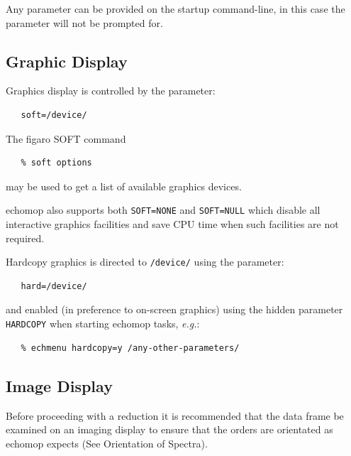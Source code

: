 \documentclass[11pt,twoside]{article}
\newcommand{\htmlref}[2]{#1}
\newcommand{\xref}[3]{#1}
\newcommand{\xlabel}[1]{}
\newcommand{\mlabel}[1]{\xlabel{#1}\label{#1}}
\newcommand{\sunspec}[2]{#1}
\renewcommand{\sunspec}[2]{#2}
\newcommand{\myindex}[1]{\index{#1}}
\renewcommand{\myindex}[1]{}
\begin{document}
Any parameter can be provided on the startup command-line, in
this case the parameter will not be prompted for.


\subsection{\mlabel{graphic_display}Graphic Display}
\myindex{Graphics!setting device}

Graphics display is controlled by the parameter:

\begin{verbatim}
   soft=/device/
\end{verbatim}

The \xref{{\sc figaro}}{sun86}{} \xref{SOFT}{sun86}{SOFT} command

\myindex{FIGARO!SOFT}
\begin{verbatim}
   % soft options
\end{verbatim}

may be used to get a list of available graphics devices.

\myindex{Graphics!null device}
{\sc echomop} also supports both \texttt{SOFT=NONE} and \texttt{SOFT=NULL}
which disable all interactive graphics facilities and save CPU time when
such facilities are not required.

\myindex{Graphics!hardcopy}
Hardcopy graphics is directed to {\tt /device/} using the parameter:

\begin{verbatim}
   hard=/device/
\end{verbatim}

and enabled (in preference to on-screen graphics) using the hidden
parameter \texttt{HARDCOPY} when starting {\sc echomop} tasks, {\it{e.g.}}:

\begin{verbatim}
   % echmenu hardcopy=y /any-other-parameters/
\end{verbatim}


\subsection{\mlabel{image_display}Image Display}
\myindex{Image display}

Before proceeding with a reduction it is recommended that the data frame
be examined on an imaging display to ensure that the orders are
orientated as {\sc echomop} expects (See \sunspec{\S\ref{orientation}}
{\htmlref{Orientation of Spectra}{orientation}}).
\end{document}
